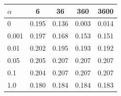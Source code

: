 \begin{tabular}{l c c c c}
\toprule
$\alpha$ & 6 & 36 & 360 & 3600 \\
\midrule
0 & 0.195 & 0.136 & 0.003 & 0.014 \\
0.001 & 0.197 & 0.168 & 0.153 & 0.151 \\
0.01 & 0.202 & 0.195 & 0.193 & 0.192 \\
0.05 & 0.205 & 0.207 & 0.207 & 0.207 \\
0.1 & 0.204 & 0.207 & 0.207 & 0.207 \\
1.0 & 0.180 & 0.184 & 0.184 & 0.183 \\
\bottomrule
\end{tabular}